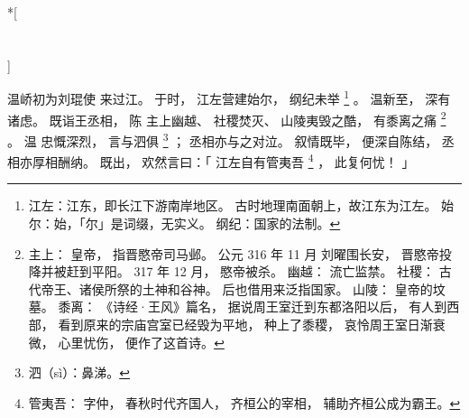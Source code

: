 
\switchcolumn[0]*[\section{}]

温峤初为刘琨使
来过江。
于时，
江左营建始尔，
纲纪未举%
\footnote{%
    江左：江东，即长江下游南岸地区。
          古时地理南面朝上，故江东为江左。
    始尔：始，「尔」是词缀，无实义。
    纲纪：国家的法制。
}%
。
温新至，
深有诸虑。
既诣王丞相，
陈
主上幽越、
社稷焚灭、
山陵夷毁之酷，
有黍离之痛%
\footnote{%
    主上：
        皇帝，
        指晋愍帝司马邺。
        公元 316 年 11 月
        刘曜围长安，
        晋愍帝投降并被赶到平阳。
        317 年 12 月，
        愍帝被杀。
    幽越：
        流亡监禁。
    社稷：
        古代帝王、诸侯所祭的土神和谷神。
        后也借用来泛指国家。
    山陵：
        皇帝的坟墓。
    黍离：
        《诗经·王风》篇名，
        据说周王室迁到东都洛阳以后，
        有人到西部，
        看到原来的宗庙宫室已经毁为平地，
        种上了黍稷，
        哀怜周王室日渐衰微，
        心里忧伤，
        便作了这首诗。
}%
。
温
忠慨深烈，
言与泗俱%
\footnote{%
    泗（sì）：鼻涕。
}%
；
丞相亦与之对泣。
叙情既毕，
便深自陈结，
丞相亦厚相酬纳。
既出，
欢然言曰：「
    江左自有管夷吾%
    \footnote{%
        管夷吾：
            字仲，
            春秋时代齐国人，
            齐桓公的宰相，
            辅助齐桓公成为霸王。
    }%
    ，
    此复何忧！
」

\switchcolumn




